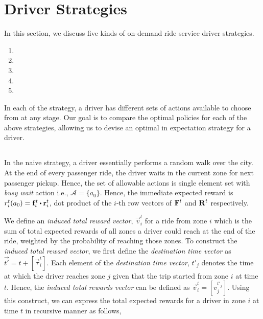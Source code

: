 
\section{Driver Strategies}
\label{sec:driver_strategies}

In this section, we discuss five kinds of on-demand ride service
driver strategies.
\begin{enumerate}
    \item {\naive} 
    \item {\relocation} 
    \item {\flexible} 
    \item {\relocationflexible}
    \item {\earningsgoal}
\end{enumerate}

In each of the strategy, a driver has different sets of actions available to choose from at any stage. Our goal is to compare the optimal policies for each of the above strategies, allowing us to devise an optimal in expectation strategy for a driver.

\subsection{\naive}
In the naive strategy, a driver essentially performs a random walk over the city. At the end of every passenger ride, the driver waits in the current zone for next passenger pickup. Hence, the set of allowable actions is single element set with \textit{busy wait} action i.e., $\mathcal{A} = \{a_0\}$. Hence, the immediate expected reward is $r_{i}^{t}(a_0) = \vec{f}_{i}^{t} \bigcdot \vec{r}_{i}^{t}$, dot product of the $i$-th row vectors of $\mathbf{F}^{t}$ and $\mathbf{R}^{t}$ respectively. 

We define an \textit{induced total reward vector}, $\vec{v}_i^{t}$ for a ride from zone $i$ which is the sum of total expected rewards of all zones a driver could reach at the end of the ride, weighted by the probability of reaching those zones. To construct the \textit{induced total reward vector}, we first define the \textit{destination time vector} as $\vec{t'} = t + [\vec{\tau}_i^t]$. Each element of the \textit{destination time vector}, $t'_j$ denotes the time at which the driver reaches zone $j$ given that the trip started from zone $i$ at time $t$. Hence, the \textit{induced total rewards vector} can be defined as $\vec{v}_{i}^{t} = [v_{j}^{t'_j}]$. Using this construct, we can express the total expected rewards for a driver in zone $i$ at time $t$ in recursive manner as follows,

